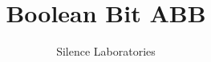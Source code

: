 \documentclass{article}
\begin{document}
\title{Boolean Bit ABB}
\author{Silence Laboratories}
\maketitle





\end{document}
